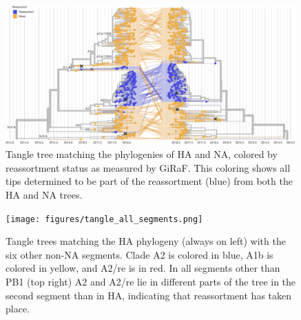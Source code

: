 \begin{figure}[b]
  \begin{center}
  \includegraphics[width=0.99\textwidth]{figures/giraf_reassortment_results.png}
  \end{center}
  \caption{Tangle tree matching the phylogenies of HA and NA, colored by reassortment status as measured by GiRaF. This coloring shows all tips determined to be part of the reassortment (blue) from both the HA and NA trees.}
  \label{sup_fig:giraf}
\end{figure}

\begin{figure}[b]
    \begin{center}
    \texttt{[image: figures/tangle\_all\_segments.png]}
    \end{center}
    \caption{Tangle trees matching the HA phylogeny (always on left) with the six other non-NA segments. Clade A2 is colored in blue, A1b is colored in yellow, and A2/re is in red. In all segments other than PB1 (top right) A2 and A2/re lie in different parts of the tree in the second segment than in HA, indicating that reassortment has taken place.}
    \label{sup_fig:all_tangle}
\end{figure}
